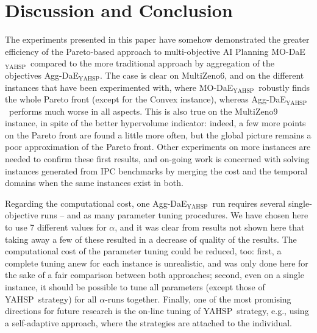 \documentclass{llncs}
\def\YAHSP{{\sc YAHSP}}
\def\MULTIZENO{{\sc MultiZeno}}
\def\MODAEYAHSP{{\sc MO-DaE$_{\text{YAHSP}}$}}
\def\AGGDAEYAHSP{{\sc Agg-DaE$_{\text{YAHSP}}$}}
\begin{document}
\section{Discussion and Conclusion}
\label{sec:conclusion}

\vskip -0.4cm
The experiments presented in this paper have somehow demonstrated the greater efficiency of the Pareto-based approach to multi-objective AI Planning \MODAEYAHSP\ compared to the more traditional approach by aggregation of the objectives \AGGDAEYAHSP. The case is clear on \MULTIZENO6, and on the different instances that have been experimented with, where \MODAEYAHSP\ robustly finds the whole Pareto front (except for the {\sc Convex} instance), whereas \AGGDAEYAHSP\ performs much worse in all aspects. %
This is also true on the \MULTIZENO9 instance, in spite of the better hypervolume indicator: indeed, a few more points on the Pareto front are found a little more often, but the global picture remains a poor approximation of the Pareto front. Other experiments on more instances are needed to confirm these first results, and on-going work is concerned with solving instances generated from IPC benchmarks by merging the cost and the temporal 
domains when the same instances exist in both.

Regarding the computational cost, one \AGGDAEYAHSP\ run requires several single-objective runs -- and as many parameter tuning procedures. We have chosen here to use 7 different values for $\alpha$, and it was clear from results not shown here that taking away a few of these resulted in a decrease of quality of the results. The computational cost of the parameter tuning could be reduced, too: first, a complete tuning anew for each instance is unrealistic, and was only done here for the sake of a fair comparison between both approaches; second, even on a single instance, it should be possible to  tune all parameters (except those of \YAHSP\ strategy) for all $\alpha$-runs together.
Finally, one of the most promising directions for future research is the on-line tuning of \YAHSP\ strategy, e.g., using a self-adaptive approach, where the strategies are attached to the individual.



{\small


}
\end{document}
